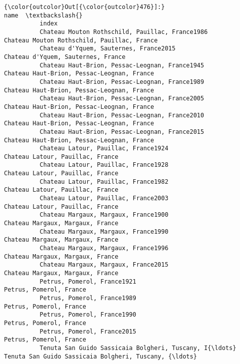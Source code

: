 \documentclass[11pt]{article}
\begin{document}
\begin{Verbatim}[commandchars=\\\{\}]
{\color{outcolor}Out[{\color{outcolor}476}]:}                                                                                                  name  \textbackslash{}
          index                                                                                                   
          Chateau Mouton Rothschild, Pauillac, France1986           Chateau Mouton Rothschild, Pauillac, France   
          Chateau d'Yquem, Sauternes, France2015                             Chateau d'Yquem, Sauternes, France   
          Chateau Haut-Brion, Pessac-Leognan, France1945             Chateau Haut-Brion, Pessac-Leognan, France   
          Chateau Haut-Brion, Pessac-Leognan, France1989             Chateau Haut-Brion, Pessac-Leognan, France   
          Chateau Haut-Brion, Pessac-Leognan, France2005             Chateau Haut-Brion, Pessac-Leognan, France   
          Chateau Haut-Brion, Pessac-Leognan, France2010             Chateau Haut-Brion, Pessac-Leognan, France   
          Chateau Haut-Brion, Pessac-Leognan, France2015             Chateau Haut-Brion, Pessac-Leognan, France   
          Chateau Latour, Pauillac, France1924                                 Chateau Latour, Pauillac, France   
          Chateau Latour, Pauillac, France1928                                 Chateau Latour, Pauillac, France   
          Chateau Latour, Pauillac, France1982                                 Chateau Latour, Pauillac, France   
          Chateau Latour, Pauillac, France2003                                 Chateau Latour, Pauillac, France   
          Chateau Margaux, Margaux, France1900                                 Chateau Margaux, Margaux, France   
          Chateau Margaux, Margaux, France1990                                 Chateau Margaux, Margaux, France   
          Chateau Margaux, Margaux, France1996                                 Chateau Margaux, Margaux, France   
          Chateau Margaux, Margaux, France2015                                 Chateau Margaux, Margaux, France   
          Petrus, Pomerol, France1921                                                   Petrus, Pomerol, France   
          Petrus, Pomerol, France1989                                                   Petrus, Pomerol, France   
          Petrus, Pomerol, France1990                                                   Petrus, Pomerol, France   
          Petrus, Pomerol, France2015                                                   Petrus, Pomerol, France   
          Tenuta San Guido Sassicaia Bolgheri, Tuscany, I{\ldots}  Tenuta San Guido Sassicaia Bolgheri, Tuscany, {\ldots}   

\end{Verbatim}
\end{document}
